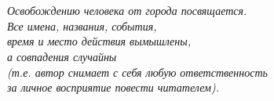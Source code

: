 \chapter*{}
\begin{flushright}
\vspace{2.0cm}
\textit{ \large {
Освобождению человека от города посвящается.\\
\vspace{\fill}
Все имена, названия, события,\\
время и место действия вымышлены,\\
а совпадения случайны\\
(т.е. автор снимает с себя любую ответственность\\ 
за личное восприятие повести читателем).
}}
\end{flushright}


